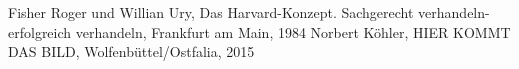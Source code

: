 \begin{thebibliography}{99.}

 Fisher Roger und Willian Ury, Das Harvard-Konzept. Sachgerecht verhandeln-erfolgreich verhandeln, Frankfurt am Main, 1984
 Norbert Köhler, HIER KOMMT DAS BILD, Wolfenbüttel/Ostfalia, 2015

\end{thebibliography}